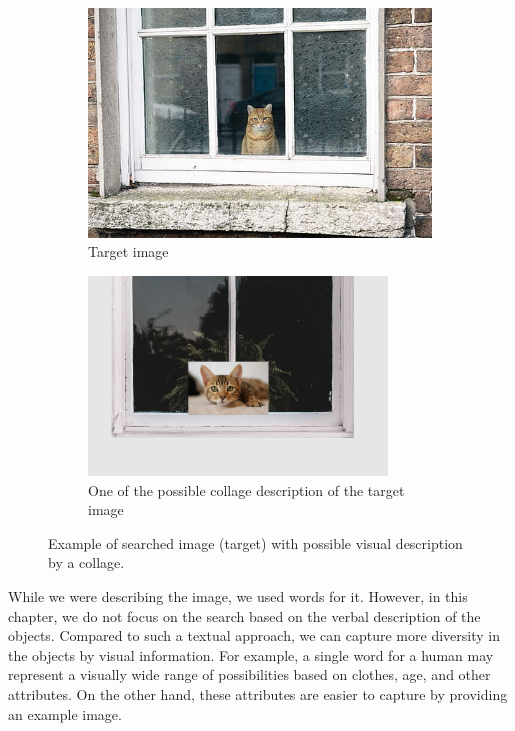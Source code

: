 \begin{figure}
\centering

\begin{subfigure}[t]{0.45\textwidth}
\includegraphics[width=0.9\linewidth]{img/cat_on_window} 
\caption{Target image}
\label{fig:searched_scene}
\end{subfigure}
\begin{subfigure}[t]{0.45\textwidth}
\includegraphics[width=0.9\linewidth]{img/cat_on_window_collage}
\caption{One of the possible collage description of the target image}
\label{fig:collage_example}
\end{subfigure}

\caption{Example of searched image (target) with possible visual description by a collage.}
\label{fig:query_collage_comparison}
\end{figure}

While we were describing the image, we used words for it. However, in this chapter, we do not focus on the search based on the verbal description of the objects. Compared to such a textual approach, we can capture more diversity in the objects by visual information. For example, a single word for a human may represent a visually wide range of possibilities based on clothes, age, and other attributes. On the other hand, these attributes are easier to capture by providing an example image.


